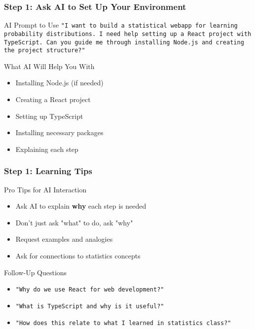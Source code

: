 \documentclass[aspectratio=169]{beamer}
\begin{document}
\begin{frame}
\frametitle{Step 1: Ask AI to Set Up Your Environment}
\begin{alertblock}{AI Prompt to Use}
\texttt{"I want to build a statistical webapp for learning probability distributions. I need help setting up a React project with TypeScript. Can you guide me through installing Node.js and creating the project structure?"}
\end{alertblock}

\begin{exampleblock}{What AI Will Help You With}
\begin{itemize}
\item Installing Node.js (if needed)
\item Creating a React project
\item Setting up TypeScript
\item Installing necessary packages
\item Explaining each step
\end{itemize}
\end{exampleblock}
\end{frame}

\begin{frame}
\frametitle{Step 1: Learning Tips}
\begin{alertblock}{Pro Tips for AI Interaction}
\begin{itemize}
\item Ask AI to explain \textbf{why} each step is needed
\item Don't just ask "what" to do, ask "why"
\item Request examples and analogies
\item Ask for connections to statistics concepts
\end{itemize}
\end{alertblock}

\begin{exampleblock}{Follow-Up Questions}
\begin{itemize}
\item \texttt{"Why do we use React for web development?"}
\item \texttt{"What is TypeScript and why is it useful?"}
\item \texttt{"How does this relate to what I learned in statistics class?"}
\end{itemize}
\end{exampleblock}
\end{frame}
\end{document}
